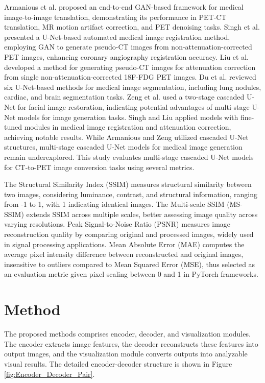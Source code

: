 \documentclass[a4paper, times, 10pt,twocolumn]{article}
\begin{document}
Armanious et al. \cite{armanious_medgan_2020} proposed an end-to-end GAN-based framework for medical image-to-image translation, demonstrating its performance in PET-CT translation, MR motion artifact correction, and PET denoising tasks. Singh et al. \cite{singh_automated_2023} presented a U-Net-based automated medical image registration method, employing GAN to generate pseudo-CT images from non-attenuation-corrected PET images, enhancing coronary angiography registration accuracy. Liu et al. \cite{liu_deep_2018} developed a method for generating pseudo-CT images for attenuation correction from single non-attenuation-corrected 18F-FDG PET images. Du et al. \cite{du_medical_2020} reviewed six U-Net-based methods for medical image segmentation, including lung nodules, cardiac, and brain segmentation tasks. Zeng et al. \cite{zeng_swin-casunet_2022} used a two-stage cascaded U-Net for facial image restoration, indicating potential advantages of multi-stage U-Net models for image generation tasks. Singh and Liu applied models with fine-tuned modules in medical image registration and attenuation correction, achieving notable results. While Armanious and Zeng utilized cascaded U-Net structures, multi-stage cascaded U-Net models for medical image generation remain underexplored. This study evaluates multi-stage cascaded U-Net models for CT-to-PET image conversion tasks using several metrics.

The Structural Similarity Index \cite{zhou_wang_image_2004} (SSIM) measures structural similarity between two images, considering luminance, contrast, and structural information, ranging from -1 to 1, with 1 indicating identical images. The Multi-scale SSIM (MS-SSIM) extends SSIM across multiple scales, better assessing image quality across varying resolutions. Peak Signal-to-Noise Ratio \cite{hore_image_2010} (PSNR) measures image reconstruction quality by comparing original and processed images, widely used in signal processing applications. Mean Absolute Error\cite{chai_root_2014} (MAE) computes the average pixel intensity difference between reconstructed and original images, insensitive to outliers compared to Mean Squared Error (MSE), thus selected as an evaluation metric given pixel scaling between 0 and 1 in PyTorch frameworks.

\section{Method}
The proposed methods comprises encoder, decoder, and visualization modules. The encoder extracts image features, the decoder reconstructs these features into output images, and the visualization module converts outputs into analyzable visual results. The detailed encoder-decoder structure is shown in Figure \ref{fig:Encoder_Decoder_Pair}.
\end{document}

